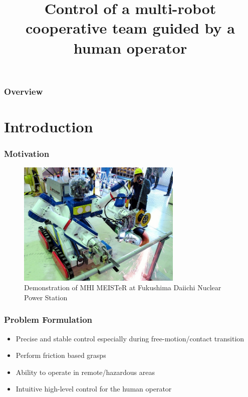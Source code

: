 \documentclass[student]{ITRslides}
\title{Control of a multi-robot cooperative team guided by a human operator}
\begin{document}
\begin{frame}
    \titlepage
\end{frame}

\begin{frame}
	\frametitle{Overview}
    \tableofcontents%
\end{frame}

\section{Introduction}

\begin{frame}
	\frametitle{Motivation}
		\begin{figure}[htb]
			\centering
			\includegraphics[width=0.7\textwidth]{mhi-meister45.jpg}
			\caption{Demonstration of MHI MEISTeR at Fukushima Daiichi 					Nuclear Power Station}
		\end{figure}
\end{frame}

\begin{frame}
	\frametitle{Problem Formulation}

	\begin{itemize}
		\item Precise and stable control especially during free-motion/contact transition
		\item Perform friction based grasps
		\item Ability to operate in remote/hazardous areas
		\item Intuitive high-level control for the human operator
	\end{itemize}

\end{frame}
\end{document}
